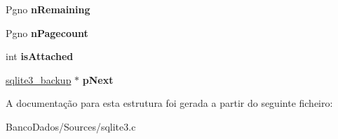 \begin{DoxyCompactItemize}
\item 
\hypertarget{structsqlite3__backup_a4287faa23d4534e8a33915740604d1e1}{Pgno {\bfseries n\-Remaining}}\label{structsqlite3__backup_a4287faa23d4534e8a33915740604d1e1}

\item 
\hypertarget{structsqlite3__backup_a98599d5a3a13173a6a126242d1fbbaa8}{Pgno {\bfseries n\-Pagecount}}\label{structsqlite3__backup_a98599d5a3a13173a6a126242d1fbbaa8}

\item 
\hypertarget{structsqlite3__backup_af515f0d9265847d820cbaad41cef78ae}{int {\bfseries is\-Attached}}\label{structsqlite3__backup_af515f0d9265847d820cbaad41cef78ae}

\item 
\hypertarget{structsqlite3__backup_a3a87332e045fe4a477fe262409c6011a}{\hyperlink{structsqlite3__backup}{sqlite3\-\_\-backup} $\ast$ {\bfseries p\-Next}}\label{structsqlite3__backup_a3a87332e045fe4a477fe262409c6011a}

\end{DoxyCompactItemize}


A documentação para esta estrutura foi gerada a partir do seguinte ficheiro\-:\begin{DoxyCompactItemize}
\item 
Banco\-Dados/\-Sources/sqlite3.\-c\end{DoxyCompactItemize}
